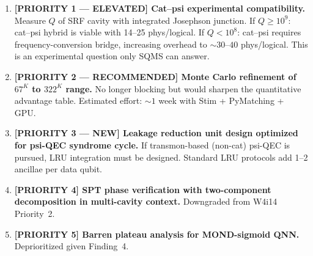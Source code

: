 \documentclass[11pt]{article}
\theoremstyle{definition}
\theoremstyle{remark}
\begin{document}
\begin{enumerate}

\item \textbf{[PRIORITY 1 --- ELEVATED] Cat--psi experimental
  compatibility.}
  Measure $Q$ of SRF cavity with integrated Josephson junction.  If
  $Q \geq 10^9$: cat--psi hybrid is viable with 14--25 phys/logical.
  If $Q < 10^8$: cat--psi requires frequency-conversion bridge,
  increasing overhead to $\sim 30$--$40$ phys/logical.  This is an
  experimental question only SQMS can answer.

\item \textbf{[PRIORITY 2 --- RECOMMENDED] Monte Carlo refinement of
  $67^K$ to $322^K$ range.}
  No longer blocking but would sharpen the quantitative advantage table.
  Estimated effort: $\sim 1$ week with Stim + PyMatching + GPU.

\item \textbf{[PRIORITY 3 --- NEW] Leakage reduction unit design
  optimized for psi-QEC syndrome cycle.}
  If transmon-based (non-cat) psi-QEC is pursued, LRU integration
  must be designed.  Standard LRU protocols add 1--2 ancillae per
  data qubit.

\item \textbf{[PRIORITY 4] SPT phase verification with two-component
  decomposition in multi-cavity context.}
  Downgraded from W4i14 Priority~2.

\item \textbf{[PRIORITY 5] Barren plateau analysis for MOND-sigmoid QNN.}
  Deprioritized given Finding~4.

\end{enumerate}
\end{document}
